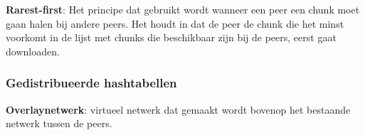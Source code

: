\noindent \textbf{Rarest-first}: Het principe dat gebruikt wordt wanneer een peer een chunk moet gaan halen bij andere peers. Het houdt in dat de peer de chunk die het minst voorkomt in de lijst met chunks die beschikbaar zijn bij de peers, eerst gaat downloaden.

\subsubsection{Gedistribueerde hashtabellen}

\noindent \textbf{Overlaynetwerk}: virtueel netwerk dat gemaakt wordt bovenop het bestaande netwerk tussen de peers.